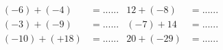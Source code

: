 \documentclass[a4paper,12pt]{beamer}
\begin{document}
\begin{frame}
	\begin{align*}
		(-6) + (-4)   & = ...... & 12 + (-8)  & = ...... \\
		(-3) + (-9)   & = ...... & (-7) + 14  & = ...... \\
		(-10) + (+18) & = ...... & 20 + (-29) & = ...... \\
	\end{align*}
\end{frame}
\end{document}
